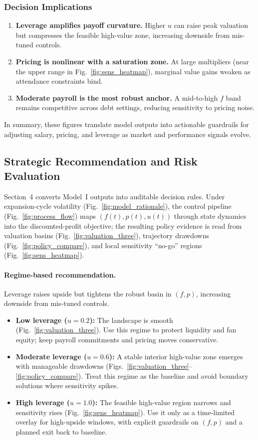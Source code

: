 \documentclass[12pt]{article}
\numberwithin{figure}{section}
\numberwithin{table}{section}
\begin{document}
	
	\subsubsection*{Decision Implications}
	\begin{enumerate}
		\item \textbf{Leverage amplifies payoff curvature.} Higher $u$ can raise peak valuation but compresses the feasible high-value zone, increasing downside from mis-tuned controls.
		\item \textbf{Pricing is nonlinear with a saturation zone.} At large multipliers (near the upper range in Fig.~\ref{fig:sens_heatmap}), marginal value gains weaken as attendance constraints bind.
		\item \textbf{Moderate payroll is the most robust anchor.} A mid-to-high $f$ band remains competitive across debt settings, reducing sensitivity to pricing noise.
	\end{enumerate}
	
	In summary, these figures translate model outputs into actionable guardrails for adjusting salary, pricing, and leverage as market and performance signals evolve.
	
	
	\subsection{Strategic Recommendation and Risk Evaluation}
	Section~4 converts Model~I outputs into auditable decision rules. 
	Under expansion-cycle volatility (Fig.~\ref{fig:model_rationale}), the control pipeline (Fig.~\ref{fig:process_flow}) maps $(f(t),p(t),u(t))$ through state dynamics into the discounted-profit objective; the resulting policy evidence is read from valuation basins (Fig.~\ref{fig:valuation_three}), trajectory drawdowns (Fig.~\ref{fig:policy_compare}), and local sensitivity ``no-go'' regions (Fig.~\ref{fig:sens_heatmap}).
	
	\paragraph{Regime-based recommendation.}
	Leverage raises upside but tightens the robust basin in $(f,p)$, increasing downside from mis-tuned controls.
	\begin{itemize}
		\item \textbf{Low leverage ($u=0.2$):} The landscape is smooth (Fig.~\ref{fig:valuation_three}). 
		Use this regime to protect liquidity and fan equity; keep payroll commitments and pricing moves conservative.
		\item \textbf{Moderate leverage ($u=0.6$):} A stable interior high-value zone emerges with manageable drawdowns (Figs.~\ref{fig:valuation_three}--\ref{fig:policy_compare}). 
		Treat this regime as the baseline and avoid boundary solutions where sensitivity spikes.
		\item \textbf{High leverage ($u=1.0$):} The feasible high-value region narrows and sensitivity rises (Fig.~\ref{fig:sens_heatmap}). 
		Use it only as a time-limited overlay for high-upside windows, with explicit guardrails on $(f,p)$ and a planned exit back to baseline.
	\end{itemize}
	
\end{document}
